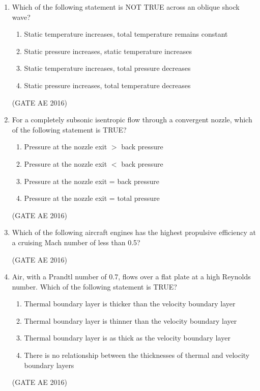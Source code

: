 \documentclass[journal,12pt,onecolumn]{IEEEtran}
\theoremstyle{remark}
\begin{document}
\begin{enumerate}
\item Which of the following statement is NOT TRUE across an oblique shock wave?  
\begin{enumerate}
\item Static temperature increases, total temperature remains constant
\item Static pressure increases, static temperature increases
\item  Static temperature increases, total pressure decreases
\item Static pressure increases, total temperature decreases
\end{enumerate}
\hfill(GATE AE 2016)



\item  For a completely subsonic isentropic flow through a convergent nozzle, which of the following statement is TRUE?  
\begin{enumerate}
\item  Pressure at the nozzle exit $>$ back pressure
\item  Pressure at the nozzle exit $<$ back pressure
\item  Pressure at the nozzle exit = back pressure
\item  Pressure at the nozzle exit = total pressure
\end{enumerate}
\hfill(GATE AE 2016)



\item Which of the following aircraft engines has the highest propulsive efficiency at a cruising Mach number of less than 0.5?  
\begin{enumerate}
\end{enumerate}
\hfill(GATE AE 2016)



\item Air, with a Prandtl number of 0.7, flows over a flat plate at a high Reynolds number. Which of the following statement is TRUE?  
\begin{enumerate}
\item  Thermal boundary layer is thicker than the velocity boundary layer
\item  Thermal boundary layer is thinner than the velocity boundary layer  
\item  Thermal boundary layer is as thick as the velocity boundary layer  
\item  There is no relationship between the thicknesses of thermal and velocity boundary layers
\end{enumerate}
\hfill(GATE AE 2016)




\end{enumerate}
\end{document}
